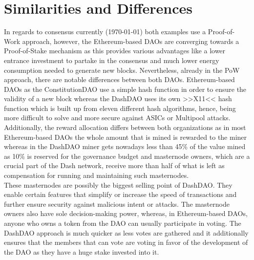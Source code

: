 \documentclass[a4paper,12pt]{report}
\begin{document}
	\section{Similarities and Differences}
	\startsection
	    In regards to consensus currently (\today) both examples use a Proof-of-Work approach, however, the Ethereum-based DAOs are converging towards a Proof-of-Stake mechanism as this provides various advantages like a lower entrance investment to partake in the consensus and much lower energy consumption needed to generate new blocks. Nevertheless, already in the PoW approach, there are notable differences between both DAOs. Ethereum-based DAOs as the ConstitutionDAO use a simple hash function in order to ensure the validity of a new block whereas the DashDAO uses its own >>X11<< hash function which is built up from eleven different hash algorithms, hence, being more difficult to solve and more secure against ASICs or Multipool attacks. Additionally, the reward allocation differs between both organizations as in most Ethereum-based DAOs the whole amount that is mined is rewarded to the miner whereas in the DashDAO miner gets nowadays less than 45\% of the value mined as 10\% is reserved for the governance budget and masternode owners, which are a crucial part of the Dash network, receive more than half of what is left as compensation for running and maintaining such masternodes. \\
	    These masternodes are possibly the biggest selling point of DashDAO. They enable certain features that simplify or increase the speed of transactions and further ensure security against malicious intent or attacks. The masternode owners also have sole decision-making power, whereas, in Ethereum-based DAOs, anyone who owns a token from the DAO can usually participate in voting. The DashDAO approach is much quicker as less votes are gathered and it additionally ensures that the members that can vote are voting in favor of the development of the DAO as they have a huge stake invested into it.
	\closesection
	
\end{document}
